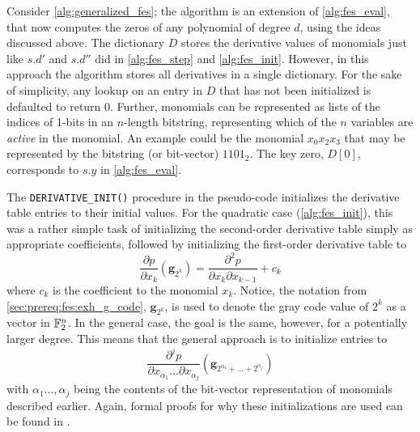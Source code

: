 Consider \cref{alg:generalized_fes}; the algorithm is an extension of \cref{alg:fes_eval}, that now computes the zeros of any polynomial of degree $d$, using the ideas discussed above. The dictionary $D$ stores the derivative values of monomials just like $s.d'$ and $s.d''$ did in \cref{alg:fes_step} and \cref{alg:fes_init}. However, in this approach the algorithm stores all derivatives in a single dictionary. For the sake of simplicity, any lookup on an entry in $D$ that has not been initialized is defaulted to return $0$. Further, monomials can be represented as lists of the indices of 1-bits in an $n$-length bitstring, representing which of the $n$ variables are \textit{active} in the monomial. An example could be the monomial $x_0x_2x_3$ that may be represented by the bitstring (or bit-vector) $1101_2$. The key zero, $D[0]$, corresponds to $s.y$ in \cref{alg:fes_eval}.

The \texttt{DERIVATIVE\_INIT()} procedure in the pseudo-code initializes the derivative table entries to their initial values. For the quadratic case (\cref{alg:fes_init}), this was a rather simple task of initializing the second-order derivative table simply as appropriate coefficients, followed by initializing the first-order derivative table to 
$$
    \frac{\partial p}{\partial x_k}(\mathbf{g}_{2^k}) = \frac{\partial^2 p}{\partial x_{k} \partial x_{k - 1}} + c_k
$$
where $c_k$ is the coefficient to the monomial $x_k$. Notice, the notation from \cref{sec:prereq:fes:exh_g_code}, $\mathbf{g}_{2^k}$, is used to denote the gray code value of $2^k$ as a vector in $\mathbb{F}_2^n$. In the general case, the goal is the same, however, for a potentially larger degree. This means that the general approach is to initialize entries to 
$$
    \frac{\partial^j p}{\partial x_{\alpha_1} \dots \partial x_{\alpha_j}}(\mathbf{g}_{2^{\alpha_1} + \dots + 2^{\alpha_j}})
$$
with $\alpha_1 \dots, \alpha_j$ being the contents of the bit-vector representation of monomials described earlier. Again, formal proofs for why these initializations are used can be found in \cite{tungchoumasters}.

